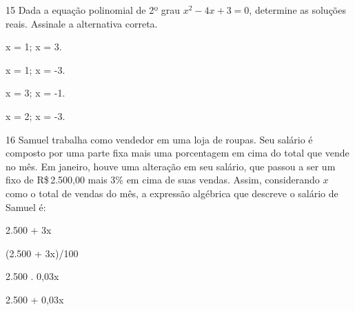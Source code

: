 
\pagebreak

\num{15} Dada a equação polinomial de 2º grau $x^2 - 4x + 3 = 0$, determine as
soluções reais. Assinale a alternativa correta.

\begin{escolha}
\item
  x = 1; x = 3.
\item
  x = 1; x = -3.
\item
  x = 3; x = -1.
\item
  x = 2; x = -3.
\end{escolha}








\num{16} Samuel trabalha como vendedor em uma loja de roupas. Seu salário é
composto por uma parte fixa mais uma porcentagem em cima do total que
vende no mês. Em janeiro, houve uma alteração em seu salário, que passou
a ser um fixo de R\$\,2.500,00 mais 3\% em cima de suas vendas. Assim,
considerando $x$ como o total de vendas do mês, a expressão algébrica
que descreve o salário de Samuel é:

\begin{escolha}
\item 2.500 + 3x
\item (2.500 + 3x)/100
\item 2.500 . 0,03x
\item 2.500 + 0,03x
\end{escolha}

